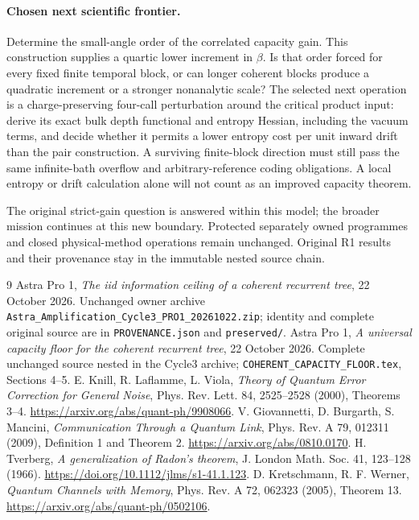 \documentclass[11pt]{article}
\begin{document}
\paragraph{Chosen next scientific frontier.}
Determine the small-angle order of the correlated capacity gain. This
construction supplies a quartic lower increment in $\beta$. Is that order
forced for every fixed finite temporal block, or can longer coherent blocks
produce a quadratic increment or a stronger nonanalytic scale? The selected
next operation is a charge-preserving four-call perturbation around the
critical product input: derive its exact bulk depth functional and entropy
Hessian, including the vacuum terms, and decide whether it permits a lower
entropy cost per unit inward drift than the pair construction. A surviving
finite-block direction must still pass the same infinite-bath overflow and
arbitrary-reference coding obligations. A local entropy or drift calculation
alone will not count as an improved capacity theorem.

The original strict-gain question is answered within this model; the broader
mission continues at this new boundary. Protected separately owned programmes
and closed physical-method operations remain unchanged. Original R1 results
and their provenance stay in the immutable nested source chain.

\appendix


\begin{thebibliography}{9}\footnotesize\setlength{\itemsep}{1pt}\setlength{\parskip}{0pt}
 Astra Pro 1, \emph{The iid information ceiling of a coherent recurrent tree},
22 October 2026. Unchanged owner archive
\texttt{Astra\_Amplification\_Cycle3\_PRO1\_20261022.zip}; identity and complete
original source are in \texttt{PROVENANCE.json} and \texttt{preserved/}.
 Astra Pro 1, \emph{A universal capacity floor for the coherent recurrent tree},
22 October 2026. Complete unchanged source nested in the Cycle3 archive;
\texttt{COHERENT\_CAPACITY\_FLOOR.tex}, Sections 4--5.
 E. Knill, R. Laflamme, L. Viola,
\emph{Theory of Quantum Error Correction for General Noise},
Phys. Rev. Lett. 84, 2525--2528 (2000), Theorems 3--4.
\url{https://arxiv.org/abs/quant-ph/9908066}.
 V. Giovannetti, D. Burgarth, S. Mancini,
\emph{Communication Through a Quantum Link}, Phys. Rev. A 79, 012311 (2009),
Definition 1 and Theorem 2. \url{https://arxiv.org/abs/0810.0170}.
 H. Tverberg, \emph{A generalization of Radon's theorem},
J. London Math. Soc. 41, 123--128 (1966).
\url{https://doi.org/10.1112/jlms/s1-41.1.123}.
 D. Kretschmann, R. F. Werner, \emph{Quantum Channels with Memory},
Phys. Rev. A 72, 062323 (2005), Theorem 13.
\url{https://arxiv.org/abs/quant-ph/0502106}.
\end{thebibliography}
\end{document}
